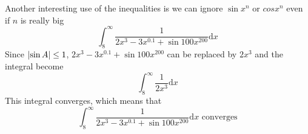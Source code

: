 \documentclass{article}
\begin{document}
Another interesting use of the inequalities is we can ignore $\sin x^n$ or $cos x^n$ even if $n$ is really big
\[
    \int_{8}^{\infty} \frac{1}{2x^3 -3x^{0.1} + \sin {100x^{200}}} \mathrm{d}x
\]
Since $\abs{\sin A}\leq 1$, $2x^3 -3x^{0.1} + \sin {100x^{200}}$ can be replaced by $2x^3$ and the integral become
\[
    \int_{8}^{\infty} \frac{1}{2x^3}\mathrm{d}x
\]
This integral converges, which means that 
\[
    \int_{8}^{\infty} \frac{1}{2x^3 -3x^{0.1} + \sin {100x^{200}}} \mathrm{d}x \text{ converges}
\] 
\end{document}
